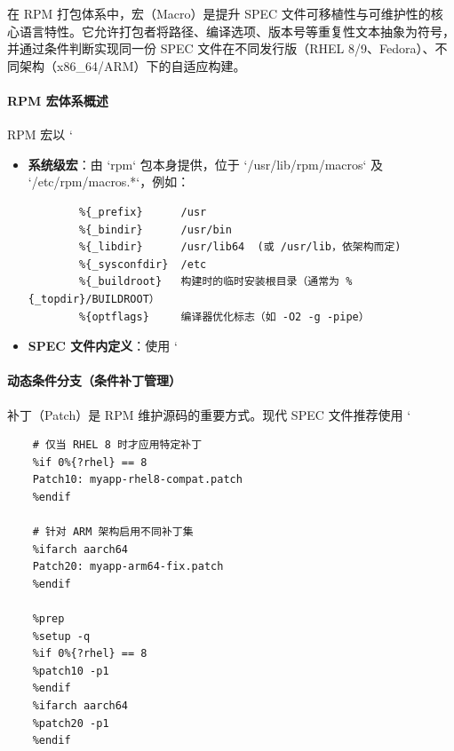\documentclass[12pt,UTF8]{ctexbook}
\begin{document}
在 RPM 打包体系中，宏（Macro）是提升 SPEC 文件可移植性与可维护性的核心语言特性。它允许打包者将路径、编译选项、版本号等重复性文本抽象为符号，并通过条件判断实现同一份 SPEC 文件在不同发行版（RHEL 8/9、Fedora）、不同架构（x86\_64/ARM）下的自适应构建。

\paragraph{RPM 宏体系概述}
RPM 宏以 `%
\begin{itemize}
	\item \textbf{系统级宏}：由 `rpm` 包本身提供，位于 `/usr/lib/rpm/macros` 及 `/etc/rpm/macros.*`，例如：
	\begin{verbatim}
		%{_prefix}      /usr
		%{_bindir}      /usr/bin
		%{_libdir}      /usr/lib64  (或 /usr/lib，依架构而定)
		%{_sysconfdir}  /etc
		%{_buildroot}   构建时的临时安装根目录（通常为 %{_topdir}/BUILDROOT）
		%{optflags}     编译器优化标志（如 -O2 -g -pipe）
	\end{verbatim}
	\item \textbf{SPEC 文件内定义}：使用 `%
\end{itemize}

\paragraph{动态条件分支（条件补丁管理）}
补丁（Patch）是 RPM 维护源码的重要方式。现代 SPEC 文件推荐使用 `%

\begin{verbatim}
	# 仅当 RHEL 8 时才应用特定补丁
	%if 0%{?rhel} == 8
	Patch10: myapp-rhel8-compat.patch
	%endif
	
	# 针对 ARM 架构启用不同补丁集
	%ifarch aarch64
	Patch20: myapp-arm64-fix.patch
	%endif
	
	%prep
	%setup -q
	%if 0%{?rhel} == 8
	%patch10 -p1
	%endif
	%ifarch aarch64
	%patch20 -p1
	%endif
\end{verbatim}
\end{document}
